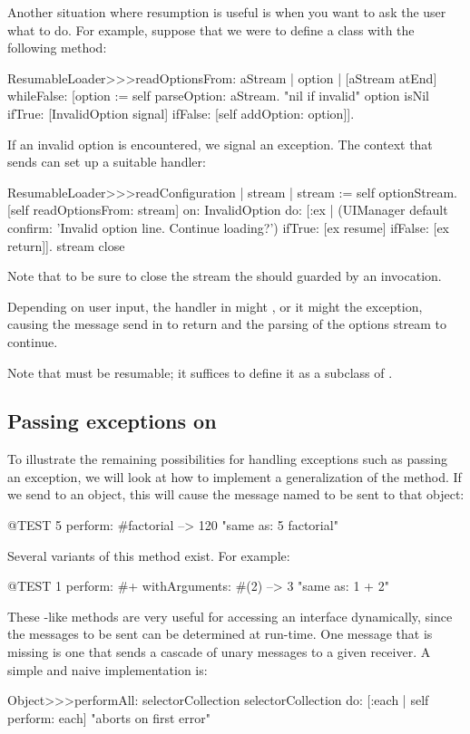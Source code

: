 \documentclass[a4paper,10pt,twoside]{book}
\begin{document}
Another situation where resumption is useful is when you want to ask the user what to do.  For example, suppose that we were to define a class  with the following method:
\begin{code}{}
ResumableLoader>>>readOptionsFrom: aStream 
	| option |
	[aStream atEnd]
		whileFalse: [option := self parseOption: aStream.
			"nil if invalid"
			option isNil
				ifTrue: [InvalidOption signal]
				ifFalse: [self addOption: option]].
\end{code}
\noindent
If an invalid option is encountered, we signal an  exception.
The context that sends  can set up a suitable handler:

\begin{code}{}
ResumableLoader>>>readConfiguration
	| stream |
	stream := self optionStream.
	[self readOptionsFrom: stream]
		on: InvalidOption
		do: [:ex | (UIManager default confirm: 'Invalid option line. Continue loading?')
				ifTrue: [ex resume]
				ifFalse: [ex return]].
	stream close
\end{code}

Note that to be sure to close the stream the  should guarded by an  invocation.

\noindent
Depending on user input, the handler in  might  , or it might  the exception, causing the  message send in  to return and the parsing of the options stream to continue.

Note that  must be resumable; it suffices to define it as a subclass of .


\subsection{Passing exceptions on}

To illustrate the remaining possibilities for handling exceptions such as passing an exception, we will look at how to implement a generalization of the  method. If we send  to an object, this will cause the message named  to be sent  to that object:
\begin{code}{@TEST}
5 perform: #factorial --> 120    "same as: 5 factorial"
\end{code}

Several variants of this method exist. For example:
\begin{code}{@TEST}
1 perform: #+ withArguments: #(2) --> 3    "same as: 1 + 2"
\end{code}
These -like methods are very useful for accessing an interface dynamically, since the messages to be sent can be determined at run-time. One message that is missing is one that sends a cascade of unary messages to a given receiver. A simple and naive implementation is:
\begin{code}{}
Object>>>performAll: selectorCollection
	selectorCollection do: [:each | self perform: each]    "aborts on first error"
\end{code}
\end{document}
